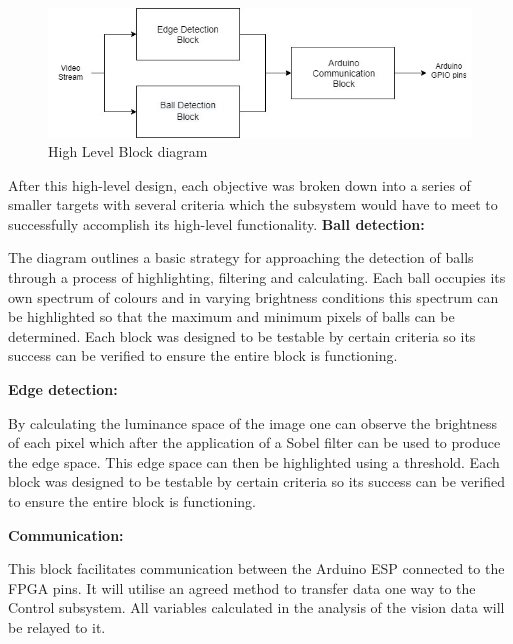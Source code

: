 \documentclass[10pt,twoside]{article}
\begin{document}
\begin{figure}[hbt!]
    \centering
    \includegraphics[scale=0.35]{HighLevelDesign.jpg}
    \captionsetup{justification=centering}
    \caption{High Level Block diagram}
\end{figure}

\smallbreak
After this high-level design, each objective was broken down into a series of smaller targets with several criteria which the subsystem would have to meet to successfully accomplish its high-level functionality. 
\smallbreak
\textbf{Ball detection:}

The diagram outlines a basic strategy for approaching the detection of balls through a process of highlighting, filtering and calculating. Each ball occupies its own spectrum of colours and in varying brightness conditions this spectrum can be highlighted so that the maximum and minimum pixels of balls can be determined. Each block was designed to be testable by certain criteria so its success can be verified to ensure the entire block is functioning. 

\textbf{Edge detection:}

By calculating the luminance space of the image one can observe the brightness of each pixel which after the
application of a Sobel filter can be used to produce the edge space. This edge space can then be highlighted
using a threshold. Each block was designed to be testable by certain
criteria so its success can be verified to ensure the entire block is functioning.

\textbf{Communication:}

This block facilitates communication between the Arduino ESP connected to the FPGA pins. It will utilise an agreed method to transfer data one way to the Control subsystem. All variables calculated in the analysis of the vision data will be relayed to it.
\end{document}
